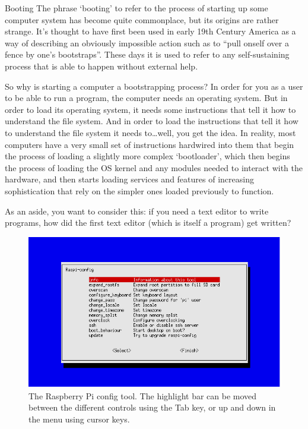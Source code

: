 \begin{diversion}{Booting}
\label{bootbox}
The phrase `booting' to refer to the process of starting up some computer system has become quite commonplace, but its origins are rather strange. It's thought to have first been used in early 19th Century America as a way of describing an obviously impossible action such as to ``pull onself over a fence by one's bootstraps''. These days it is used to refer to any self-sustaining process that is able to happen without external help. 

So why is starting a computer a bootstrapping process? In order for you as a user to be able to run a program, the computer needs an operating system. But in order to load its operating system, it needs some instructions that tell it how to understand the file system. And in order to load the instructions that tell it how to understand the file system it needs to\ldots well, you get the idea. In reality, most computers have a very small set of instructions hardwired into them that begin the process of loading a  slightly more complex `bootloader', which then begins the process of loading the OS kernel and any modules needed to interact with the hardware, and then starts loading services and features of increasing sophistication that rely on the simpler ones loaded previously to function. 

As an aside, you want to consider this: if you need a text editor to write programs, how did the first text editor (which is itself a program) get written?
\end{diversion}

\begin{figure}
\centerline{\includegraphics[width=13cm]{images/raspi-config.png}}
\caption{The Raspberry Pi config tool. The highlight bar can be moved between the different controls using the Tab key, or up and down in the menu using cursor keys.}\label{figure:raspi-config}
\end{figure}

